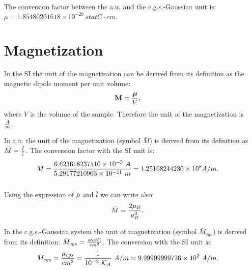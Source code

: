 \documentclass[12pt,a4paper]{article}
\def\barl{5.29177210903\times 10^{-11}}
\def\bari{6.623618237510\times 10^{-3}}
\def\barmag{1.25168244230\times 10^{8}}
\def\mutomu{9.99999999726\times 10^{-4}}
\def\magtomag{9.99999999726\times 10^{2}}
\def\barmucgs{1.85480201618\times 10^{-20}}
\begin{document}

{\color{green} 
The conversion factor between the a.u. and the c.g.s.-Gaussian unit is: 
$\bar \mu = \barmucgs\ statC\cdot cm$.
}

\newpage
\section{\color{coral}Magnetization}
In the SI the unit of the magnetization can be derived from its definition
as the magnetic dipole moment per unit volume:
\begin{equation}
{\bf M} = {{\boldsymbol \mu}\over V},
\end{equation}
where $V$ is the volume of the sample.
Therefore the unit of the magnetization is $A\over m$.  

{\color{web-blue} In a.u. the unit of the magnetization 
(symbol $\bar M$) is derived from its definition
as $\bar M= {\bar I \over \bar l}$. The conversion factor with
the SI unit is:
\begin{equation}
\bar M = {\bari\ A \over \barl\ m} = \barmag A/m.
\end{equation}
\\
Using the expression of $\bar \mu$ and $\bar l$ we can write also:
\begin{equation}
\bar M = {2 \mu_B \over a_B^3}.
\end{equation}
}

{\color{orange} In the c.g.s.-Gaussian system the unit of magnetization
(symbol $\bar M_{cgs}$) is derived from its definition: 
$\bar M_{cgs}={statC \over cm^2}$.
The conversion with the SI unit is:
\begin{equation}
\bar M_{cgs} = {\bar \mu_{cgs} \over cm^3}={1\over 10^{-2}\ \mathcal{K}_A}\ A/m =
\magtomag\ A/m.
\end{equation}
}
\\
\end{document}

